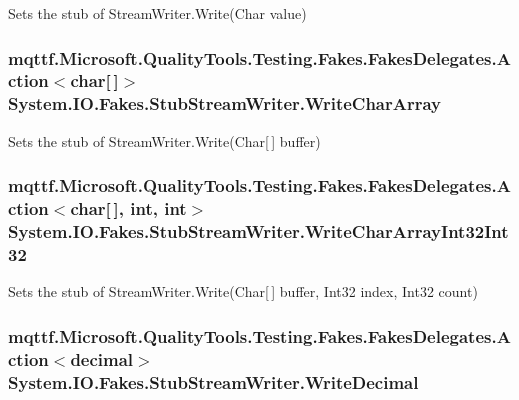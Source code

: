 Sets the stub of Stream\-Writer.\-Write(\-Char value)

\hypertarget{class_system_1_1_i_o_1_1_fakes_1_1_stub_stream_writer_a61fef34aca3bbfe74ee8ad3b8e637900}{
\subsubsection[{Write\-Char\-Array}]{\setlength{\rightskip}{0pt plus 5cm}mqttf.\-Microsoft.\-Quality\-Tools.\-Testing.\-Fakes.\-Fakes\-Delegates.\-Action$<$char\mbox{[}$\,$\mbox{]}$>$ System.\-I\-O.\-Fakes.\-Stub\-Stream\-Writer.\-Write\-Char\-Array}}\label{class_system_1_1_i_o_1_1_fakes_1_1_stub_stream_writer_a61fef34aca3bbfe74ee8ad3b8e637900}


Sets the stub of Stream\-Writer.\-Write(\-Char\mbox{[}$\,$\mbox{]} buffer)

\hypertarget{class_system_1_1_i_o_1_1_fakes_1_1_stub_stream_writer_a0775227ed19e5c73f3ef0a4b78235a6b}{
\subsubsection[{Write\-Char\-Array\-Int32\-Int32}]{\setlength{\rightskip}{0pt plus 5cm}mqttf.\-Microsoft.\-Quality\-Tools.\-Testing.\-Fakes.\-Fakes\-Delegates.\-Action$<$char\mbox{[}$\,$\mbox{]}, int, int$>$ System.\-I\-O.\-Fakes.\-Stub\-Stream\-Writer.\-Write\-Char\-Array\-Int32\-Int32}}\label{class_system_1_1_i_o_1_1_fakes_1_1_stub_stream_writer_a0775227ed19e5c73f3ef0a4b78235a6b}


Sets the stub of Stream\-Writer.\-Write(\-Char\mbox{[}$\,$\mbox{]} buffer, Int32 index, Int32 count)

\hypertarget{class_system_1_1_i_o_1_1_fakes_1_1_stub_stream_writer_a0e0490e1d9510bcced1d0a8496968b28}{
\subsubsection[{Write\-Decimal}]{\setlength{\rightskip}{0pt plus 5cm}mqttf.\-Microsoft.\-Quality\-Tools.\-Testing.\-Fakes.\-Fakes\-Delegates.\-Action$<$decimal$>$ System.\-I\-O.\-Fakes.\-Stub\-Stream\-Writer.\-Write\-Decimal}}\label{class_system_1_1_i_o_1_1_fakes_1_1_stub_stream_writer_a0e0490e1d9510bcced1d0a8496968b28}


